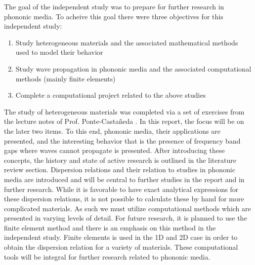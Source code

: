\documentclass{article}
\begin{document}
The goal of the independent study was to prepare for further research in 
phononic media. To acheive this goal there were three objectives for this 
independent study:
\begin{enumerate}
	\item Study heterogeneous materials and the associated mathematical methods 
	used to model their behavior
	\item Study wave propagation in phononic media and the associated 
	computational methods (mainly finite elements)
	\item Complete a computational project related to the above studies 
\end{enumerate}
The study of heterogeneous materials was completed via a set of exercises from 
the lecture notes of Prof. Ponte-Casta\~neda \cite{pontenotes}. In this report, 
the focus will be on the later two items. To this end, phononic media, their 
applications are presented, and the interesting behavior that is the 
presence of frequency band gaps where waves cannot propagate is presented. 
After introducing these concepts, the history and state of active research is 
outlined in the literature review section. Dispersion relations and their 
relation to studies in phononic media are introduced and will be central to 
further studies in the report and in further research. While it is favorable to 
have exact analytical expressions for these dispersion relations, it is not 
possible to calculate these by hand for more complicated materials. As such we 
must utilize computational methods which are presented in varying levels of 
detail. For future research, it is planned to use the finite element method and 
there is an emphasis on this method in the independent study. Finite elements 
is used in the 1D and 2D case in order to obtain the dispersion relation for a 
variety of materials. These computational tools will be integral for further 
research related to phononic media. 

\end{document}
